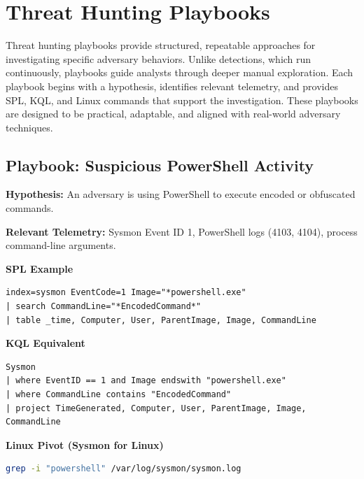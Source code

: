 \section{Threat Hunting Playbooks}

Threat hunting playbooks provide structured, repeatable approaches for investigating specific adversary behaviors. 
Unlike detections, which run continuously, playbooks guide analysts through deeper manual exploration. Each playbook 
begins with a hypothesis, identifies relevant telemetry, and provides SPL, KQL, and Linux commands that support the 
investigation. These playbooks are designed to be practical, adaptable, and aligned with real-world adversary techniques.


\subsection*{Playbook: Suspicious PowerShell Activity}

\textbf{Hypothesis:}  
An adversary is using PowerShell to execute encoded or obfuscated commands.

\textbf{Relevant Telemetry:}  
Sysmon Event ID 1, PowerShell logs (4103, 4104), process command-line arguments.

\textbf{SPL Example}

\begin{lstlisting}
index=sysmon EventCode=1 Image="*powershell.exe"
| search CommandLine="*EncodedCommand*"
| table _time, Computer, User, ParentImage, Image, CommandLine
\end{lstlisting}

\textbf{KQL Equivalent}

\begin{lstlisting}
Sysmon
| where EventID == 1 and Image endswith "powershell.exe"
| where CommandLine contains "EncodedCommand"
| project TimeGenerated, Computer, User, ParentImage, Image, CommandLine
\end{lstlisting}

\textbf{Linux Pivot (Sysmon for Linux)}

\begin{lstlisting}[language=bash]
grep -i "powershell" /var/log/sysmon/sysmon.log
\end{lstlisting}

